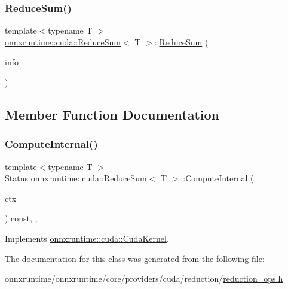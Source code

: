 \subsubsection{\texorpdfstring{Reduce\+Sum()}{ReduceSum()}}
{\footnotesize\ttfamily template$<$typename T $>$ \\
\mbox{\hyperlink{classonnxruntime_1_1cuda_1_1ReduceSum}{onnxruntime\+::cuda\+::\+Reduce\+Sum}}$<$ T $>$\+::\mbox{\hyperlink{classonnxruntime_1_1cuda_1_1ReduceSum}{Reduce\+Sum}} (\begin{DoxyParamCaption}\item[{const \mbox{\hyperlink{classonnxruntime_1_1OpKernelInfo}{Op\+Kernel\+Info}} \&}]{info }\end{DoxyParamCaption})\hspace{0.3cm}{\ttfamily [inline]}}



\subsection{Member Function Documentation}
\mbox{\label{classonnxruntime_1_1cuda_1_1ReduceSum_a4921d463701f4ad89256532b402e77ca}} 
\subsubsection{\texorpdfstring{Compute\+Internal()}{ComputeInternal()}}
{\footnotesize\ttfamily template$<$typename T $>$ \\
\mbox{\hyperlink{classonnxruntime_1_1common_1_1Status}{Status}} \mbox{\hyperlink{classonnxruntime_1_1cuda_1_1ReduceSum}{onnxruntime\+::cuda\+::\+Reduce\+Sum}}$<$ T $>$\+::Compute\+Internal (\begin{DoxyParamCaption}\item[{\mbox{\hyperlink{classonnxruntime_1_1OpKernelContext}{Op\+Kernel\+Context}} $\ast$}]{ctx }\end{DoxyParamCaption}) const\hspace{0.3cm}{\ttfamily [inline]}, {\ttfamily [override]}, {\ttfamily [virtual]}}



Implements \mbox{\hyperlink{classonnxruntime_1_1cuda_1_1CudaKernel_aca7af04ae448017d6023d30bba231ebb}{onnxruntime\+::cuda\+::\+Cuda\+Kernel}}.



The documentation for this class was generated from the following file\+:\begin{DoxyCompactItemize}
\item 
onnxruntime/onnxruntime/core/providers/cuda/reduction/\mbox{\hyperlink{cuda_2reduction_2reduction__ops_8h}{reduction\+\_\+ops.\+h}}\end{DoxyCompactItemize}
